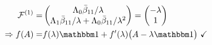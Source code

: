 \documentclass[12pt]{article}
\newcommand{\del}{\partial}
\begin{document}
\begin{itemize}
\begin{align*}
\mathcal F^{(1)} =& \begin{pmatrix} \Lambda_0 \bar\beta_{11}/\lambda \\ \Lambda_1 \bar\beta_{11}/\lambda + \Lambda_0 \bar\beta_{11}/\lambda^2 \end{pmatrix} = \begin{pmatrix} -\lambda \\ 1 \end{pmatrix}\\
\Rightarrow f(A) =& f(\lambda)\mathbbm 1 + f'(\lambda)\big( A - \lambda\mathbbm 1 \big)\ \checkmark
\end{align*}
\end{itemize}

\begin{comment}
\begin{align}
\alpha_{m,n-1} =& \sum_{k=1}^r \lambda_k^m \sum_{l=0}^{\mu_k-1} \bar\beta_{kl} \frac{(m+l)!}{m!} = \sum_{k=1}^r \sum_{l=0}^{\mu_k-1} \bar\beta_{kl} \left. \del_\lambda^l \lambda^{m+l} \right|_{\lambda = \lambda_k} \eqqcolon \sum_{k=1}^n \beta_k \lambda_k^{(m)}\\
\beta_k =& (\bar\beta_{1,0}, \dots, \bar\beta_{1,\mu_1-1},\; \bar\beta_{2,0}, \dots, \bar\beta_{2,\mu_2-1},\; \dots,\; \bar\beta_{r,0}, \dots, \bar\beta_{r,\mu_r-1})_k \nonumber\\
\lambda_k^{(m)} =& (\lambda_1^m, \dots, \del_{\lambda_1}^{\mu_1-1} \lambda_1^{m+\mu_1-1},\; \lambda_2^m, \dots, \del_{\lambda_2}^{\mu_2-1} \lambda_2^{m+\mu_2-1},\; \dots,\; \lambda_r^m, \dots, \del_{\lambda_r}^{\mu_r-1} \lambda_r^{m+\mu_r-1})_k \nonumber
\end{align}
For $m<n:\ \alpha_{mk} = \delta_{mk}\ \Rightarrow \delta_{m,n-1} = \beta_k \lambda_k^{(m)}$
\begin{align}
\Rightarrow \vec \beta \perp& \sum_{k=1}^n \hat e_k \lambda_k^m \eqqcolon \vec \lambda^{(m)} \ \text{for}\ m=0\dots n-2 \nonumber\\
\tilde\beta_k \coloneqq& \det(\hat e_k | \vec\lambda^{(n-2)} | \vec\lambda^{(n-3)} | \dots | \vec\lambda^{(0)})\nonumber\\
\beta =& \tilde\beta /\big( \tilde \beta \cdot \lambda^{(n-1)} \big)
\end{align}
$\eqref{recurrent ndim}$ yields for $\alpha_{mk}$:
\begin{align}
\alpha_{mk} =& \sum_{j=1}^{k+1} \alpha_{m-j,n-1} \Lambda_{k+1-j} = \sum_{j=1}^{k+1} \vec\beta\cdot\vec\lambda^{(m-j)} \Lambda_{k+1-j} = \sum_{j=0}^k \Lambda_j \vec\beta\cdot \vec\lambda^{(m+j-k-1)}
\end{align}

\end{comment}
\end{document}

